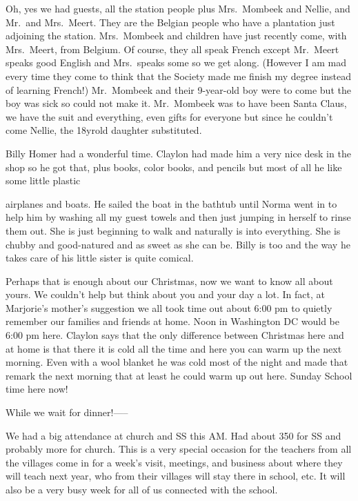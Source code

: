 \documentclass[
]{book}
\begin{document}
Oh, yes we had guests, all the station people plus Mrs.~Mombeek and Nellie, and Mr.~and Mrs.~Meert. They are the Belgian people who have a plantation just adjoining the station. Mrs.~Mombeek and children have just recently come, with Mrs.~Meert, from Belgium. Of course, they all speak French except Mr.~Meert speaks good English and Mrs.~speaks some so we get along. (However I am mad every time they come to think that the Society made me finish my degree instead of learning French!) Mr.~Mombeek and their 9-year-old boy were to come but the boy was sick so could not make it. Mr.~Mombeek was to have been Santa Claus, we have the suit and everything, even gifts for everyone but since he couldn't come Nellie, the 18yrold daughter substituted.

Billy Homer had a wonderful time. Claylon had made him a very nice desk in the shop so he got that, plus books, color books, and pencils but most of all he like some little plastic

airplanes and boats. He sailed the boat in the bathtub until Norma went in to help him by washing all my guest towels and then just jumping in herself to rinse them out. She is just beginning to walk and naturally is into everything. She is chubby and good-natured and as sweet as she can be. Billy is too and the way he takes care of his little sister is quite comical.

Perhaps that is enough about our Christmas, now we want to know all about yours. We couldn't help but think about you and your day a lot. In fact, at Marjorie's mother's suggestion we all took time out about 6:00 pm to quietly remember our families and friends at home. Noon in Washington DC would be 6:00 pm here. Claylon says that the only difference between Christmas here and at home is that there it is cold all the time and here you can warm up the next morning. Even with a wool blanket he was cold most of the night and made that remark the next morning that at least he could warm up out here. Sunday School time here now!

While we wait for dinner!-----

We had a big attendance at church and SS this AM. Had about 350 for SS and probably more for church. This is a very special occasion for the teachers from all the villages come in for a week's visit, meetings, and business about where they will teach next year, who from their villages will stay there in school, etc. It will also be a very busy week for all of us connected with the school.
\end{document}

